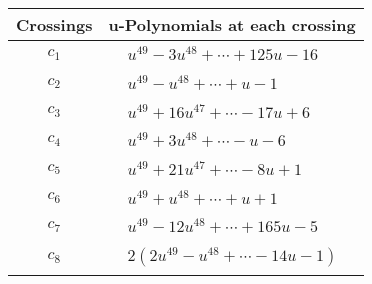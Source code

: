 \documentclass[1p]{elsarticle_modified}
\theoremstyle{definition}
\begin{document}
\begin{tabular}{m{50pt}|m{274pt}}
Crossings & \hspace{64pt}u-Polynomials at each crossing \\
\hline $$\begin{aligned}c_{1}\end{aligned}$$&$\begin{aligned}
&u^{49}-3 u^{48}+\cdots+125 u-16
\end{aligned}$\\
\hline $$\begin{aligned}c_{2}\end{aligned}$$&$\begin{aligned}
&u^{49}- u^{48}+\cdots+u-1
\end{aligned}$\\
\hline $$\begin{aligned}c_{3}\end{aligned}$$&$\begin{aligned}
&u^{49}+16 u^{47}+\cdots-17 u+6
\end{aligned}$\\
\hline $$\begin{aligned}c_{4}\end{aligned}$$&$\begin{aligned}
&u^{49}+3 u^{48}+\cdots- u-6
\end{aligned}$\\
\hline $$\begin{aligned}c_{5}\end{aligned}$$&$\begin{aligned}
&u^{49}+21 u^{47}+\cdots-8 u+1
\end{aligned}$\\
\hline $$\begin{aligned}c_{6}\end{aligned}$$&$\begin{aligned}
&u^{49}+u^{48}+\cdots+u+1
\end{aligned}$\\
\hline $$\begin{aligned}c_{7}\end{aligned}$$&$\begin{aligned}
&u^{49}-12 u^{48}+\cdots+165 u-5
\end{aligned}$\\
\hline $$\begin{aligned}c_{8}\end{aligned}$$&$\begin{aligned}
&2(2 u^{49}- u^{48}+\cdots-14 u-1)
\end{aligned}$\\

\end{tabular}
\end{document}
